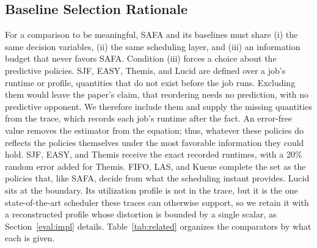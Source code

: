 \documentclass{ieeetj}
\begin{document}
\subsection{Baseline Selection Rationale}\label{baseline-rationale}
For a comparison to be meaningful, SAFA and its baselines must share (i) the same decision variables, (ii) the same scheduling layer, and (iii) an information budget that never favors SAFA. Condition (iii) forces a choice about the predictive policies. SJF, EASY, Themis, and Lucid are defined over a job's runtime or profile, quantities that do not exist before the job runs. Excluding them would leave the paper's claim, that reordering needs no prediction, with no predictive opponent. We therefore include them and supply the missing quantities from the trace, which records each job's runtime after the fact. An error-free value removes the estimator from the equation; thus, whatever these policies do reflects the policies themselves under the most favorable information they could hold. SJF, EASY, and Themis receive the exact recorded runtimes, with a 20\% random error added for Themis. FIFO, LAS, and Kueue complete the set as the policies that, like SAFA, decide from what the scheduling instant provides. Lucid sits at the boundary. Its utilization profile is not in the trace, but it is the one state-of-the-art scheduler these traces can otherwise support, so we retain it with a reconstructed profile whose distortion is bounded by a single scalar, as Section~\ref{eval:impl} details. Table~\ref{tab:related} organizes the comparators by what each is given.
\end{document}
